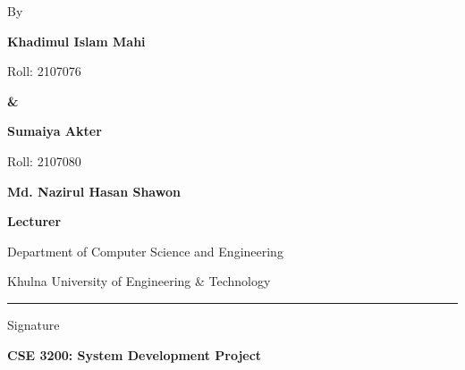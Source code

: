 \begin{titlepage}
\thispagestyle{empty}
\begingroup
\singlespacing
\vspace*{20pt}
\begin{center}
\TitleInnerBlock

\vspace{16pt}

{\fontsize{12}{18}\selectfont\normalfont By\par}

\vspace{12pt}

{\fontsize{12}{18}\selectfont\bfseries Khadimul Islam Mahi\par}
\vspace{1pt}
{\fontsize{12}{18}\selectfont\normalfont Roll: 2107076\par}

\vspace{0.12in}

{\fontsize{12}{18}\selectfont\bfseries \&\par}

\vspace{0.12in}

{\fontsize{12}{18}\selectfont\bfseries Sumaiya Akter\par}
\vspace{1pt}
{\fontsize{12}{18}\selectfont\normalfont Roll: 2107080\par}
\end{center}

\vspace{20pt}

\vspace{3pt}
\noindent\hspace*{0.8in}%
\begin{minipage}[t]{\dimexpr\textwidth-0.8in\relax}
{\fontsize{12}{18}\selectfont\bfseries Md. Nazirul Hasan Shawon\par}
\vspace{2pt}
{\fontsize{12}{18}\selectfont\bfseries Lecturer\par}
{\fontsize{12}{18}\selectfont\normalfont Department of Computer Science and Engineering\par
Khulna University of Engineering \& Technology\par}
\vspace{8pt}
\noindent\rule{2.35in}{0.45pt}\par
\vspace{2pt}
{\fontsize{12}{18}\selectfont\normalfont Signature}\par
\end{minipage}

\vspace{14pt}

\begin{center}
{\fontsize{11}{13.2}\selectfont\normalfont
\textbf{CSE 3200: System Development Project}\par}
\vspace{8pt}
\DeptFooterBlock
\end{center}
\endgroup
\end{titlepage}
